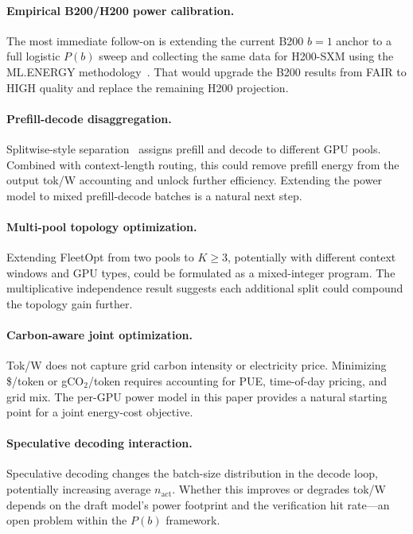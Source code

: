 \documentclass[11pt,a4paper]{article}
\begin{document}
\paragraph{Empirical B200/H200 power calibration.}
The most immediate follow-on is extending the current B200 $b{=}1$ anchor to a
full logistic $P(b)$ sweep and collecting the same data for H200-SXM using the
ML.ENERGY methodology~\citep{chung2026mlenergy}.  That would upgrade the B200
results from FAIR to HIGH quality and replace the remaining H200 projection.

\paragraph{Prefill-decode disaggregation.}
Splitwise-style separation~\citep{patel2023splitwise} assigns prefill and
decode to different GPU pools.  Combined with context-length routing, this
could remove prefill energy from the output tok/W accounting and unlock
further efficiency.  Extending the power model to mixed prefill-decode batches
is a natural next step.

\paragraph{Multi-pool topology optimization.}
Extending FleetOpt from two pools to $K \geq 3$, potentially with different
context windows and GPU types, could be formulated as a mixed-integer program.
The multiplicative independence result suggests each additional split could
compound the topology gain further.

\paragraph{Carbon-aware joint optimization.}
Tok/W does not capture grid carbon intensity or electricity price.  Minimizing
\$/token or gCO$_2$/token requires accounting for PUE, time-of-day pricing,
and grid mix.  The per-GPU power model in this paper provides a natural
starting point for a joint energy-cost objective.

\paragraph{Speculative decoding interaction.}
Speculative decoding changes the batch-size distribution in the decode loop,
potentially increasing average $n_{\text{act}}$.  Whether this improves or
degrades tok/W depends on the draft model's power footprint and the
verification hit rate---an open problem within the $P(b)$ framework.
\end{document}
